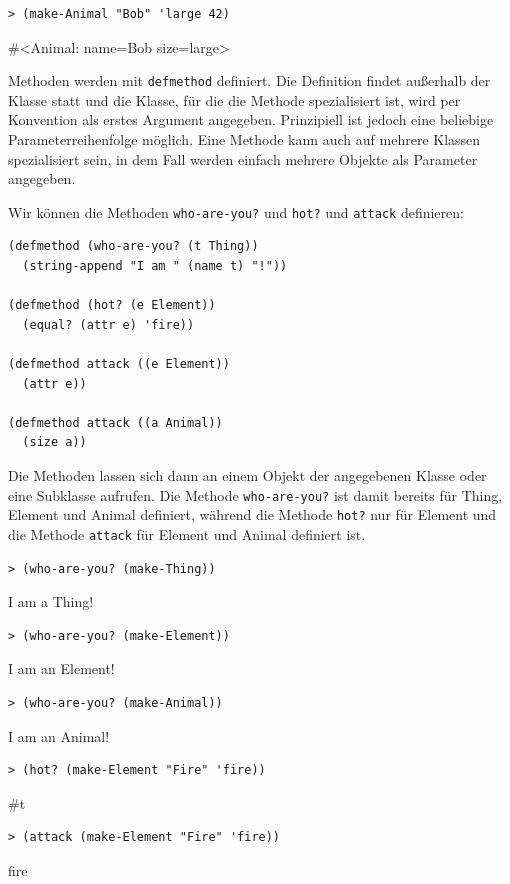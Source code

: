 \begin{lstlisting}
> (make-Animal "Bob" 'large 42)
\end{lstlisting}
{\routput \#<Animal: name={\qq}Bob{\qq} size=large>}

Methoden werden mit \texttt{defmethod} definiert. Die Definition findet außerhalb der Klasse statt und die Klasse, für die die Methode spezialisiert ist, wird per Konvention als erstes Argument angegeben. Prinzipiell ist jedoch eine beliebige Parameterreihenfolge möglich. Eine Methode kann auch auf mehrere Klassen spezialisiert sein, in dem Fall werden einfach mehrere Objekte als Parameter angegeben.

Wir können die Methoden \texttt{who-are-you?} und \texttt{hot?} und \texttt{attack} definieren:

\begin{lstlisting}
(defmethod (who-are-you? (t Thing))
  (string-append "I am " (name t) "!"))

(defmethod (hot? (e Element))
  (equal? (attr e) 'fire))
  
(defmethod attack ((e Element))
  (attr e))
  
(defmethod attack ((a Animal))
  (size a))
\end{lstlisting}

Die Methoden lassen sich dann an einem Objekt der angegebenen Klasse oder eine Subklasse aufrufen. Die Methode \texttt{who-are-you?} ist damit bereits für Thing, Element und Animal definiert, während die Methode \texttt{hot?} nur für Element und die Methode \texttt{attack} für Element und Animal definiert ist.

\begin{lstlisting}
> (who-are-you? (make-Thing))
\end{lstlisting}
{\routput {\qq}I am a Thing!\qq}

\begin{lstlisting}
> (who-are-you? (make-Element))
\end{lstlisting}
{\routput {\qq}I am an Element!\qq}

\begin{lstlisting}
> (who-are-you? (make-Animal))
\end{lstlisting}
{\routput {\qq}I am an Animal!\qq}

\begin{lstlisting}
> (hot? (make-Element "Fire" 'fire))
\end{lstlisting}
{\routput \#t}

\begin{lstlisting}
> (attack (make-Element "Fire" 'fire))
\end{lstlisting}
{\rsymbol fire}

